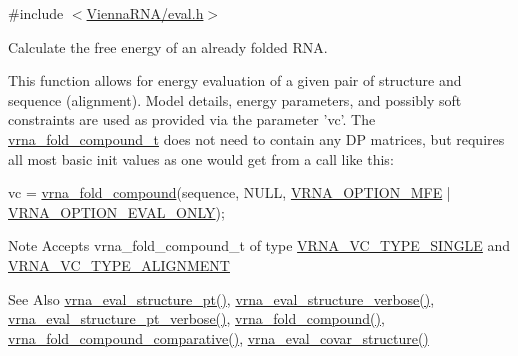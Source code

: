 {\ttfamily \#include $<$\hyperlink{eval_8h}{Vienna\-R\-N\-A/eval.\-h}$>$}



Calculate the free energy of an already folded R\-N\-A. 

This function allows for energy evaluation of a given pair of structure and sequence (alignment). Model details, energy parameters, and possibly soft constraints are used as provided via the parameter 'vc'. The \hyperlink{group__fold__compound_ga1b0cef17fd40466cef5968eaeeff6166}{vrna\-\_\-fold\-\_\-compound\-\_\-t} does not need to contain any D\-P matrices, but requires all most basic init values as one would get from a call like this\-: 
\begin{DoxyCode}
vc = \hyperlink{group__fold__compound_ga6601d994ba32b11511b36f68b08403be}{vrna\_fold\_compound}(sequence, NULL, \hyperlink{group__fold__compound_gae63be9127fe7dcc1f9bb14f5bb1064ee}{VRNA\_OPTION\_MFE} | 
      \hyperlink{group__fold__compound_ga61469c423131552c8483229f8b6c7e0e}{VRNA\_OPTION\_EVAL\_ONLY});
\end{DoxyCode}


\begin{DoxyNote}{Note}
Accepts vrna\-\_\-fold\-\_\-compound\-\_\-t of type \hyperlink{group__fold__compound_gga01a4ff86fa71deaaa5d1abbd95a1447da1608d3aa78905fc39e0d25a624ac9512}{V\-R\-N\-A\-\_\-\-V\-C\-\_\-\-T\-Y\-P\-E\-\_\-\-S\-I\-N\-G\-L\-E} and \hyperlink{group__fold__compound_gga01a4ff86fa71deaaa5d1abbd95a1447da056345f1bcfe7cd595d1fd437c05246d}{V\-R\-N\-A\-\_\-\-V\-C\-\_\-\-T\-Y\-P\-E\-\_\-\-A\-L\-I\-G\-N\-M\-E\-N\-T}
\end{DoxyNote}
\begin{DoxySeeAlso}{See Also}
\hyperlink{group__eval_gadbd09372ddfd7a450bbd590c96a6bfe4}{vrna\-\_\-eval\-\_\-structure\-\_\-pt()}, \hyperlink{group__eval_ga0928d699d310178f84ee2351034e5cb5}{vrna\-\_\-eval\-\_\-structure\-\_\-verbose()}, \hyperlink{group__eval_ga8a517cfeeae8c376ae7b1e0c401d38b4}{vrna\-\_\-eval\-\_\-structure\-\_\-pt\-\_\-verbose()}, \hyperlink{group__fold__compound_ga6601d994ba32b11511b36f68b08403be}{vrna\-\_\-fold\-\_\-compound()}, \hyperlink{group__fold__compound_gad6bacc816af274922b13d947f708aa0c}{vrna\-\_\-fold\-\_\-compound\-\_\-comparative()}, \hyperlink{group__eval_ga6cea75c0eb9857fb59172be54cab09e0}{vrna\-\_\-eval\-\_\-covar\-\_\-structure()}
\end{DoxySeeAlso}

